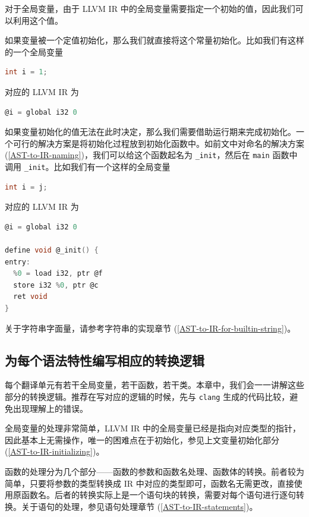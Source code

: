 对于全局变量，由于 LLVM IR 中的全局变量需要指定一个初始的值，因此我们可以利用这个值。

如果变量被一个定值初始化，那么我们就直接将这个常量初始化。比如我们有这样的一个全局变量
\begin{lstlisting}[language=C]
int i = 1;
\end{lstlisting}
对应的 LLVM IR 为
\begin{lstlisting}[language=C]
@i = global i32 0
\end{lstlisting}

如果变量初始化的值无法在此时决定，那么我们需要借助运行期来完成初始化。一个可行的解决方案是将初始化过程放到初始化函数中。如前文中对命名的解决方案
(\ref{AST-to-IR-naming})，我们可以给这个函数起名为 \texttt{\_init}，然后在
\texttt{main} 函数中调用 \texttt{\_init}。比如我们有一个这样的全局变量
\begin{lstlisting}[language=C]
int i = j;
\end{lstlisting}
对应的 LLVM IR 为
\begin{lstlisting}[language=C]
@i = global i32 0

define void @_init() {
entry:
  %0 = load i32, ptr @f
  store i32 %0, ptr @c
  ret void
}
\end{lstlisting}

关于字符串字面量，请参考字符串的实现章节 (\ref{AST-to-IR-for-builtin-string})。

\subsection{为每个语法特性编写相应的转换逻辑}\label{AST-to-IR-specific-grammar}

每个翻译单元有若干全局变量，若干函数，若干类。本章中，我们会一一讲解这些部分的转换逻辑。推荐在写对应的逻辑的时候，先与
\texttt{clang} 生成的代码比较，避免出现理解上的错误。

全局变量的处理非常简单，LLVM IR 中的全局变量已经是指向对应类型的指针，因此基本上无需操作，唯一的困难点在于初始化，参见上文变量初始化部分
(\ref{AST-to-IR-initializing})。

函数的处理分为几个部分——函数的参数和函数名处理、函数体的转换。前者较为简单，只要将参数的类型转换成
IR 中对应的类型即可，函数名无需更改，直接使用原函数名。后者的转换实际上是一个语句块的转换，需要对每个语句进行逐句转换。关于语句的处理，参见语句处理章节
(\ref{AST-to-IR-statements})。

